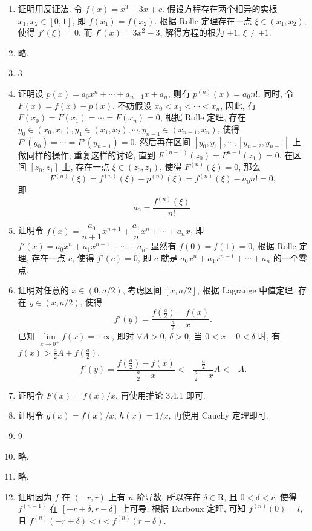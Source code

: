 \documentclass[a4paper, 11pt]{ctexart}
\begin{document}
\pagestyle{empty}
\begin{enumerate}
    \item %
        {\heiti 证明}\quad 用反证法. 令 $f(x) = x^3 - 3x + c$. 假设方程存在两个相异的实根 $x_1, x_2 \in [0, 1]$, 即 $f(x_1) = f(x_2)$.
        根据 Rolle 定理存在一点 $\xi \in (x_1, x_2)$, 使得 $f'(\xi) = 0$. 而 $f'(x) = 3x^2 - 3$, 解得方程的根为 $\pm 1$, $\xi \neq \pm 1$.
    \item %
        略.
    \item 3
    \item %
        {\heiti 证明}\quad 设 $p(x) = a_0x^n + \cdots + a_{n-1}x + a_n$, 则有 $p^{(n)}(x) = a_0n!$, 同时, 令 $F(x) = f(x) - p(x)$.
        不妨假设 $x_0 < x_1 < \cdots < x_n$, 因此, 有 $F(x_0) = F(x_1) = \cdots = F(x_n) = 0$, 根据 Rolle 定理, 存在
        $y_0 \in (x_0, x_1), y_1 \in (x_1, x_2), \cdots, y_{n-1} \in (x_{n-1}, x_n)$, 使得 $F'(y_0) = \cdots = F'(y_{n-1}) = 0$.
        然后再在区间 $[y_0, y_1], \cdots, [y_{n-2}, y_{n-1}]$ 上做同样的操作, 重复这样的讨论, 直到 $F^{(n-1)}(z_0) = F^{n-1}(z_1) = 0$.
        在区间 $[z_0, z_1]$ 上, 存在一点 $\xi \in (z_0, z_1)$, 使得 $F^{(n)}(\xi) = 0$, 那么
        \[
            F^{(n)}(\xi) = f^{(n)}(\xi) - p^{(n)}(\xi) = f^{(n)}(\xi) - a_0n! = 0,   
        \]
        即
        \[
            a_0 = \frac{f^{(n)}(\xi)}{n!}.    
        \]
    \item %
        {\heiti 证明}\quad 令 $f(x) = \dfrac{a_0}{n+1}x^{n+1} + \dfrac{a_1}{n}x^n + \cdots + a_n x$, 即 $f'(x) = a_0x^n + a_1x^{n-1} + \cdots + a_n$.
        显然有 $f(0) = f(1) = 0$, 根据 Rolle 定理, 存在一点 $c$, 使得 $f'(c) = 0$, 即 $c$ 就是 $a_0x^n + a_1x^{n-1} + \cdots + a_n$ 的一个零点.
    \item %
        {\heiti 证明}\quad 对任意的 $x \in (0, a/2)$, 考虑区间 $[x, a/2]$, 根据 Lagrange 中值定理, 存在 $y \in (x, a/2)$, 使得
        \[
            f'(y) = \frac{f(\frac{a}{2}) - f(x)}{\frac{a}{2} - x}.    
        \]
        已知 $\lim\limits_{x\to0^+}f(x) = +\infty$, 即对 $\forall A > 0$, $\delta > 0$, 当 $0 < x - 0 < \delta$ 时, 有 $f(x) > \frac{a}{2}A + f(\frac{a}{2})$.
        \[
            f'(y) = \frac{f(\frac{a}{2}) - f(x)}{\frac{a}{2} - x} < -\frac{\frac{a}{2}}{\frac{a}{2} - x}A < -A.  
        \]
    \item %
        {\heiti 证明}\quad 令 $F(x) = f(x)/x$, 再使用推论 3.4.1 即可.
    \item %
        {\heiti 证明}\quad 令 $g(x) = f(x)/x$, $h(x) = 1/x$, 再使用 Cauchy 定理即可.
    \item 9
    \item %
        略.
    \item %
        略.
    \item %
        {\heiti 证明}\quad 因为 $f$ 在 $(-r, r)$ 上有 $n$ 阶导数, 所以存在 $\delta \in \mathrm{R}$, 且 $0 < \delta < r$, 使得 $f^{(n-1)}$ 在 $[-r+\delta, r-\delta]$ 上可导.
        根据 Darboux 定理, 可知 $f^{(n)}(0) = l$, 且 $f^{(n)}(-r+\delta) < l < f^{(n)}(r-\delta)$. 
\end{enumerate}
\end{document}
